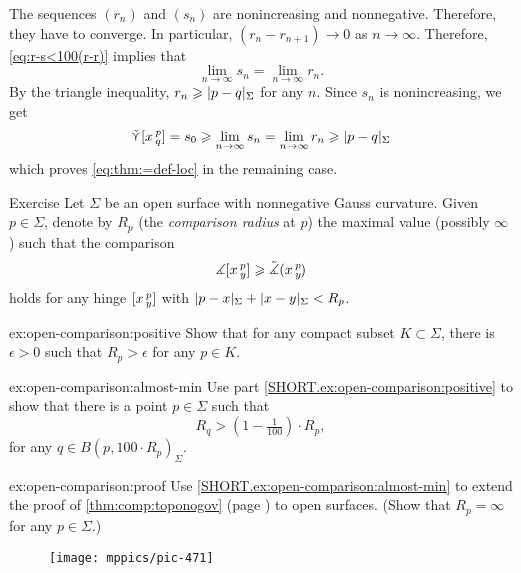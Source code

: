 The sequences $(r_n)$ and $(s_n)$ are nonincreasing and nonnegative.
Therefore, they have to converge.
In particular, $(r_n-r_{n+1})\to0$ as $n\to \infty$.
Therefore, \ref{eq:r-s<100(r-r)} implies that
\[\lim_{n\to\infty}s_n=\lim_{n\to\infty}r_n.\]
By the triangle inequality, $r_n\ge \dist{p}{q}\Sigma$ for any $n$.
Since $s_n$ is nonincreasing, we get
\[\side \hinge{x}p q=s_0\ge \lim_{n\to\infty}s_n=\lim_{n\to\infty}r_n\ge \dist{p}{q}\Sigma\]
which proves \ref{eq:thm:=def-loc} in the remaining case.
\qeds

\begin{thm}{Exercise}\label{ex:open-comparison}
Let $\Sigma$ be an open surface with nonnegative Gauss curvature.
Given $p\in\Sigma$, denote by $R_p$ 
(the {}\emph{comparison radius} at $p$) 
the maximal value (possibly $\infty$) such that the comparison 
\[\measuredangle[x\,{}^{p}_{y}]
\geqslant\tilde\measuredangle(x\,{}^{p}_{y}\hspace{-0.2ex})\]
holds for any hinge $[x\,{}^{p}_{y}]$ with $\dist{p}{x}\Sigma+\dist{x}{y}\Sigma<R_p$.

\begin{subthm}{ex:open-comparison:positive}
Show that for any compact subset $K\subset \Sigma$, there is $\epsilon>0$ such that $R_p>\epsilon$ for any $p\in K$.
\end{subthm}

\begin{subthm}{ex:open-comparison:almost-min}
Use part \ref{SHORT.ex:open-comparison:positive} to show that 
there is a point $p\in\Sigma$ such that 
\[R_q>(1-\tfrac1{100})\cdot R_p,\]
for any $q\in B(p,100\cdot R_p)_\Sigma$.
\end{subthm}

\begin{subthm}{ex:open-comparison:proof}
Use \ref{SHORT.ex:open-comparison:almost-min} to extend the proof of \ref{thm:comp:toponogov} (page \pageref{proof(thm:comp:toponogov)}) to open surfaces. 
(Show that $R_p=\infty$ for any $p\in\Sigma$.) 
\end{subthm}

\end{thm}

\begin{wrapfigure}{r}{30 mm}
\vskip4mm
\centering
\texttt{[image: mppics/pic-471]}
\end{wrapfigure}

